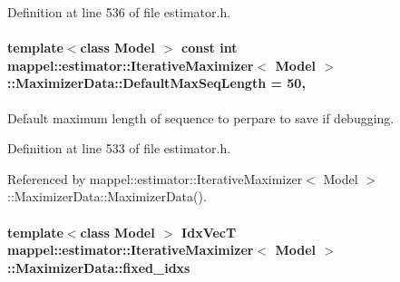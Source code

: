 Definition at line 536 of file estimator.\+h.

\paragraph[{\texorpdfstring{Default\+Max\+Seq\+Length}{DefaultMaxSeqLength}}]{\setlength{\rightskip}{0pt plus 5cm}template$<$class Model $>$ const int {\bf mappel\+::estimator\+::\+Iterative\+Maximizer}$<$ Model $>$\+::Maximizer\+Data\+::\+Default\+Max\+Seq\+Length = 50\hspace{0.3cm}{\ttfamily [static]}, {\ttfamily [protected]}}\hypertarget{classmappel_1_1estimator_1_1IterativeMaximizer_1_1MaximizerData_a38e997edb1943f364f5ec1f997d5b254}{}\label{classmappel_1_1estimator_1_1IterativeMaximizer_1_1MaximizerData_a38e997edb1943f364f5ec1f997d5b254}


Default maximum length of sequence to perpare to save if debugging. 



Definition at line 533 of file estimator.\+h.



Referenced by mappel\+::estimator\+::\+Iterative\+Maximizer$<$ Model $>$\+::\+Maximizer\+Data\+::\+Maximizer\+Data().

\paragraph[{\texorpdfstring{fixed\+\_\+idxs}{fixed_idxs}}]{\setlength{\rightskip}{0pt plus 5cm}template$<$class Model $>$ {\bf Idx\+VecT} {\bf mappel\+::estimator\+::\+Iterative\+Maximizer}$<$ Model $>$\+::Maximizer\+Data\+::fixed\+\_\+idxs}\hypertarget{classmappel_1_1estimator_1_1IterativeMaximizer_1_1MaximizerData_abb0d471c64f4f29335972f119efb6ef8}{}\label{classmappel_1_1estimator_1_1IterativeMaximizer_1_1MaximizerData_abb0d471c64f4f29335972f119efb6ef8}


